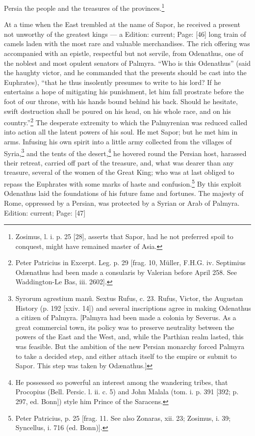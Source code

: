 Persia the people and the treasures of the provinces.\footnote{Zosimus, l. i. p. 25 [28], asserts that Sapor, had he not preferred spoil to conquest, might have remained master of Asia.}

At a time when the East trembled at the name of Sapor, he received a present not unworthy of the greatest kings \texthebrew{—} a Edition: current; Page: [46] long train of camels laden with the most rare and valuable merchandises. The rich offering was accompanied with an epistle, respectful but not servile, from Odenathus, one of the noblest and most opulent senators of Palmyra. \texthebrew{“}Who is this Odenathus\texthebrew{}” (said the haughty victor, and he commanded that the presents should be cast into the Euphrates), \texthebrew{“}that he thus insolently presumes to write to his lord? If he entertains a hope of mitigating his punishment, let him fall prostrate before the foot of our throne, with his hands bound behind his back. Should he hesitate, swift destruction shall be poured on his head, on his whole race, and on his country.\texthebrew{}”\footnote{Peter Patricius in Excerpt. Leg. p. 29 [frag. 10, Müller, F.H.G. iv. Septimius Odænathus had been made a consularis by Valerian before April 258. See Waddington-Le Bas, iii. 2602].} The desperate extremity to which the Palmyrenian was reduced called into action all the latent powers of his soul. He met Sapor; but he met him in arms. Infusing his own spirit into a little army collected from the villages of Syria,\footnote{Syrorum agrestium manû. Sextus Rufus, c. 23. Rufus, Victor, the Augustan History (p. 192 [xxiv. 14]) and several inscriptions agree in making Odenathus a citizen of Palmyra. [Palmyra had been made a colonia by Severus. As a great commercial town, its policy was to preserve neutrality between the powers of the East and the West, and, while the Parthian realm lasted, this was feasible. But the ambition of the new Persian monarchy forced Palmyra to take a decided step, and either attach itself to the empire or submit to Sapor. This step was taken by Odænathus.]} and the tents of the desert,\footnote{He possessed so powerful an interest among the wandering tribes, that Procopius (Bell. Persic. l. ii. c. 5) and John Malala (tom. i. p. 391 [392; p. 297, ed. Bonn]) style him Prince of the Saracens.} he hovered round the Persian host, harassed their retreat, carried off part of the treasure, and, what was dearer than any treasure, several of the women of the Great King; who was at last obliged to repass the Euphrates with some marks of haste and confusion.\footnote{Peter Patricius, p. 25 [frag. 11. See also Zonaras, xii. 23; Zosimus, i. 39; Syncellus, i. 716 (ed. Bonn)].} By this exploit Odenathus laid the foundations of his future fame and fortunes. The majesty of Rome, oppressed by a Persian, was protected by a Syrian or Arab of Palmyra.
Edition: current; Page: [47]

